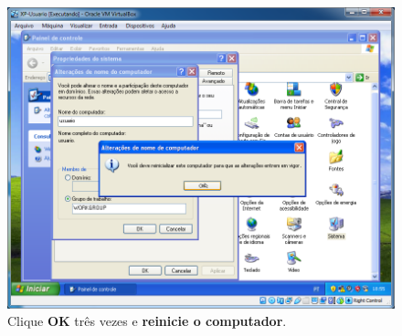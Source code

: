 \documentclass[10pt]{article}
\begin{document}
\begin{figure}[H]
    \centering
    \caption{Clique \textbf{OK} três vezes e \textbf{reinicie o computador}.}
    \label{fig:4125}
    \includegraphics[width=\linewidth]{images/xp_rede/009.png}
\end{figure}
\end{document}
